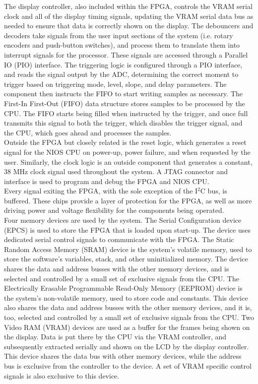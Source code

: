 \documentclass{scrartcl}
\begin{document}
	The display controller, also included within the FPGA, controls the VRAM serial clock and all of the display timing signals, updating the VRAM serial data bus as needed to ensure that data is correctly shown on the display. The debouncers and decoders take signals from the user input sections of the system (i.e. rotary encoders and push-button switches), and process them to translate them into interrupt signals for the processor. These signals are accessed through a Parallel IO (PIO) interface. The triggering logic is configured through a PIO interface, and reads the signal output by the ADC, determining the correct moment to trigger based on triggering mode, level, slope, and delay parameters. The component then instructs the FIFO to start writing samples as necessary. The First-In First-Out (FIFO) data structure stores samples to be processed by the CPU. The FIFO starts being filled when instructed by the trigger, and once full transmits this signal to both the trigger, which disables the trigger signal, and the CPU, which goes ahead and processes the samples.\\

	Outside the FPGA but closely related is the reset logic, which generates a reset signal for the NIOS CPU on power-up, power failure, and when requested by the user. Similarly, the clock logic is an outside component that generates a constant, 38 MHz clock signal used throughout the system. A JTAG connector and interface is used to program and debug the FPGA and NIOS CPU.\\

	Every signal exiting the FPGA, with the sole exception of the I$^2$C bus, is buffered. These chips provide a layer of protection for the FPGA, as well as more driving power and voltage flexibility for the components being operated.\\

	Four memory devices are used by the system. The Serial Configuration device (EPCS) is used to store the FPGA that is loaded upon start-up. The device uses dedicated serial control signals to communicate with the FPGA. The Static Random Access Memory (SRAM) device is the system's volatile memory, used to store the software's variables, stack, and other uninitialized memory. The device shares the data and address busses with the other memory devices, and is selected and controlled by a small set of exclusive signals from the CPU. The Electrically Erasable Programmable Read-Only Memory (EEPROM) device is the system's non-volatile memory, used to store code and constants. This device also shares the data and address busses with the other memory devices, and it is, too, selected and controlled by a small set of exclusive signals from the CPU. Two Video RAM (VRAM) devices are used as a buffer for the frames being shown on the display. Data is put there by the CPU via the VRAM controller, and subsequently extracted serially and shown on the LCD by the display controller. This device shares the data bus with other memory devices, while the address bus is exclusive from the controller to the device. A set of VRAM specific control signals is also exclusive to this device.\\
\end{document}
